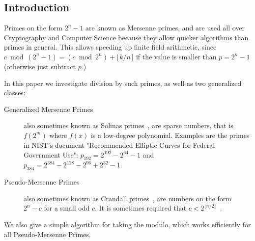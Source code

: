 
\subsection{Introduction}

Primes on the form $2^n-1$ are known as Mersenne primes, and are used all over Cryptography and Computer Science because they allow quicker algorithms than primes in general.
This allows speeding up finite field arithmetic,
since $c\bmod (2^n-1) = (c\bmod 2^n) + \lfloor k/n\rfloor$ if the value is smaller than $p=2^n-1$ (otherwise just subtract $p$.)

In this paper we investigate division by such primes, as well as two generalized classes:
\begin{description}
   \item[Generalized Mersenne Primes]
      also sometimes known as Solinas primes~\cite{Solinas2011}, are sparse numbers, that is $f(2^m)$ where $f(x)$ is a low-degree polynomial.
      Examples are the primes in NIST's document "Recommended Elliptic Curves for Federal Government Use": $p_{192} = 2^{192} - 2^{64} - 1$ and $p_{384} = 2^{384}-2^{128}-2^{96}+2^{32}-1$.
   \item[Pseudo-Mersenne Primes]
      also sometimes known as Crandall primes~\cite{crandall1992method}, are numbers on the form $2^n - c$ for a small odd $c$.
      It is sometimes required that $c < 2^{\lfloor n/2\rfloor}$~\cite{van2014encyclopedia}.
\end{description}

We also give a simple algorithm for taking the modulo, which works efficiently for all Pseudo-Mersenne Primes.

